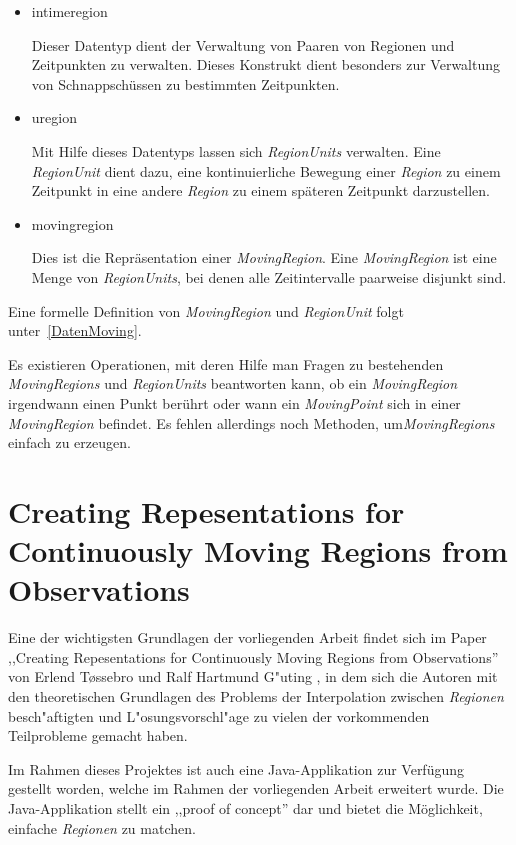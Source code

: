 \begin{itemize}
\item intimeregion

Dieser Datentyp dient der Verwaltung von Paaren von Regionen und Zeitpunkten zu verwalten. Dieses Konstrukt dient besonders zur Verwaltung von Schnappschüssen zu bestimmten Zeitpunkten.
\item uregion

Mit Hilfe dieses Datentyps lassen sich \textit{RegionUnits} verwalten. Eine \textit{RegionUnit} dient dazu, eine kontinuierliche Bewegung einer \textit{Region} zu einem Zeitpunkt in eine andere \textit{Region} zu einem späteren Zeitpunkt darzustellen. 
\item movingregion

Dies ist die Repräsentation einer \textit{MovingRegion}. Eine \textit{MovingRegion} ist eine Menge von \textit{RegionUnits}, bei denen alle Zeitintervalle paarweise disjunkt sind. 
\end{itemize}

Eine formelle Definition von \textit{MovingRegion} und \textit{RegionUnit} folgt unter~\vref{DatenMoving}.

Es existieren Operationen, mit deren Hilfe man Fragen zu bestehenden \textit{MovingRegions} und \textit{RegionUnits} beantworten kann, ob ein \textit{MovingRegion} irgendwann einen Punkt berührt oder wann ein \textit{MovingPoint} sich in einer \textit{MovingRegion} befindet. Es fehlen allerdings noch Methoden, um\textit{MovingRegions}  einfach zu erzeugen. 
 
\section{Creating Repesentations for Continuously Moving Regions from Observations}\label{Tossebro}

Eine der wichtigsten Grundlagen der vorliegenden Arbeit findet sich im Paper ,,Creating Repesentations for Continuously Moving Regions from Observations'' \cite{TG} von Erlend T\o{}ssebro und Ralf Hartmund G"uting \cite{TG}, in dem sich die Autoren mit den theoretischen Grundlagen des Problems der Interpolation zwischen \textit{Regionen} besch"aftigten und L"osungsvorschl"age zu vielen der vorkommenden Teilprobleme gemacht haben.

Im Rahmen dieses Projektes ist auch eine Java-Applikation zur Verfügung gestellt worden, welche im Rahmen der vorliegenden Arbeit erweitert wurde. Die Java-Applikation stellt ein ,,proof of concept'' dar und bietet die Möglichkeit, einfache \textit{Regionen} zu matchen.

